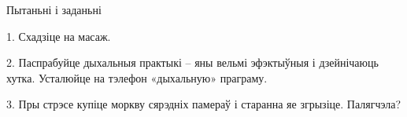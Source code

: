 Пытаньні і заданьні

1. Схадзіце на масаж.

2. Паспрабуйце дыхальныя практыкі – яны вельмі эфэктыўныя і дзейнічаюць хутка. Усталюйце на тэлефон «дыхальную» праграму.

3. Пры стрэсе купіце моркву сярэдніх памераў і старанна яе згрызіце. Палягчэла?


